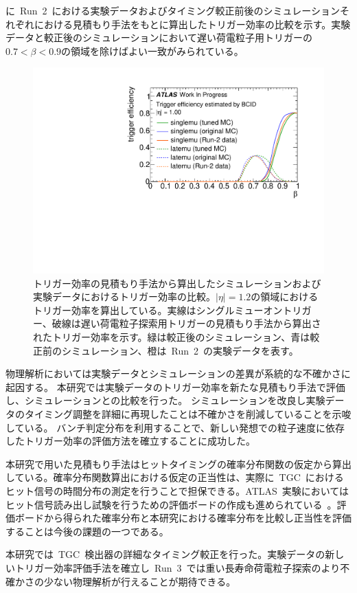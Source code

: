 に~Run~2~における実験データおよびタイミング較正前後のシミュレーションそれぞれにおける見積もり手法をもとに算出したトリガー効率の比較を示す。実験データと較正後のシミュレーションにおいて遅い荷電粒子用トリガーの$0.7<\beta<0.9$の領域を除けばよい一致がみられている。
\begin{figure}[tbp]
    \centering   
    \includegraphics[width=\textwidth,page=4]{img/rec/est_eff.pdf}
    \caption[トリガー効率の見積もり手法から算出したシミュレーションおよび実験データにおけるトリガー効率の比較]{トリガー効率の見積もり手法から算出したシミュレーションおよび実験データにおけるトリガー効率の比較。$|\eta|=1.2$の領域におけるトリガー効率を算出している。実線はシングルミューオントリガー、破線は遅い荷電粒子探索用トリガーの見積もり手法から算出されたトリガー効率を示す。緑は較正後のシミュレーション、青は較正前のシミュレーション、橙は~Run~2~の実験データを表す。}\label{fig:rectri}
\end{figure}

物理解析においては実験データとシミュレーションの差異が系統的な不確かさに起因する。
本研究では実験データのトリガー効率を新たな見積もり手法で評価し、シミュレーションとの比較を行った。
シミュレーションを改良し実験データのタイミング調整を詳細に再現したことは不確かさを削減していることを示唆している。
バンチ判定分布を利用することで、新しい発想での粒子速度に依存したトリガー効率の評価方法を確立することに成功した。

本研究で用いた見積もり手法はヒットタイミングの確率分布関数の仮定から算出している。確率分布関数算出における仮定の正当性は、実際に~TGC~におけるヒット信号の時間分布の測定を行うことで担保できる。ATLAS~実験においてはヒット信号読み出し試験を行うための評価ボードの作成も進められている~\cite{ikemo}。評価ボードから得られた確率分布と本研究における確率分布を比較し正当性を評価することは今後の課題の一つである。

本研究では~TGC~検出器の詳細なタイミング較正を行った。実験データの新しいトリガー効率評価手法を確立し~Run~3~では重い長寿命荷電粒子探索のより不確かさの少ない物理解析が行えることが期待できる。
